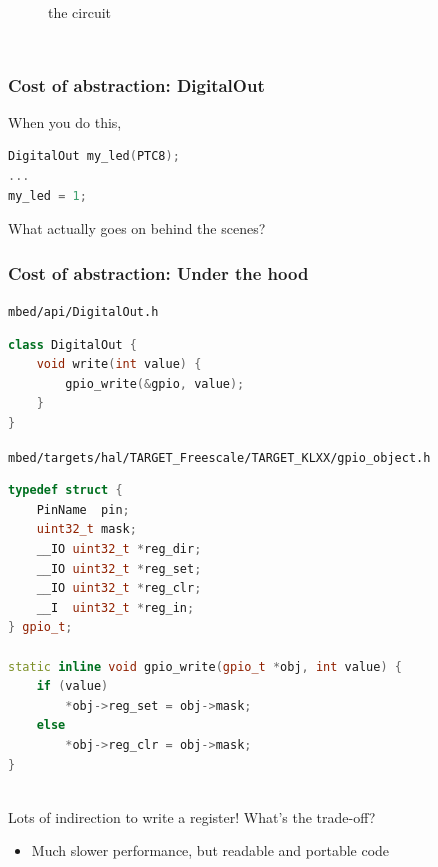 \documentclass{beamer}
\begin{document}
\begin{frame}[fragile]
\begin{columns}[t]
\begin{figure}[h!]
the circuit
\end{figure}
\end{columns}
\end{frame}


\begin{frame}[fragile]
\frametitle{Cost of abstraction: DigitalOut}
When you do this,
\begin{lstlisting}[language=C++,basicstyle=\ttfamily\tiny]
DigitalOut my_led(PTC8);
...
my_led = 1;
\end{lstlisting}
What actually goes on behind the scenes?
\end{frame}


\begin{frame}[fragile]
\frametitle{Cost of abstraction: Under the hood}
{\scriptsize \texttt{mbed/api/DigitalOut.h}}
\begin{lstlisting}[language=C++,basicstyle=\ttfamily\tiny]
class DigitalOut {
    void write(int value) {
        gpio_write(&gpio, value);
    }
}
\end{lstlisting}
{\scriptsize \texttt{mbed/targets/hal/TARGET\_Freescale/TARGET\_KLXX/gpio\_object.h}}
\begin{lstlisting}[language=C++,basicstyle=\ttfamily\tiny]
typedef struct {
    PinName  pin;
    uint32_t mask;
    __IO uint32_t *reg_dir;
    __IO uint32_t *reg_set;
    __IO uint32_t *reg_clr;
    __I  uint32_t *reg_in;
} gpio_t;

static inline void gpio_write(gpio_t *obj, int value) {
    if (value)
        *obj->reg_set = obj->mask;
    else
        *obj->reg_clr = obj->mask;
}
\end{lstlisting}
\hfill \\
Lots of indirection to write a register! What's the trade-off?
 {
\begin{itemize}
  \item Much slower performance, but readable and portable code
\end{itemize}
}
\end{frame}
\end{document}
